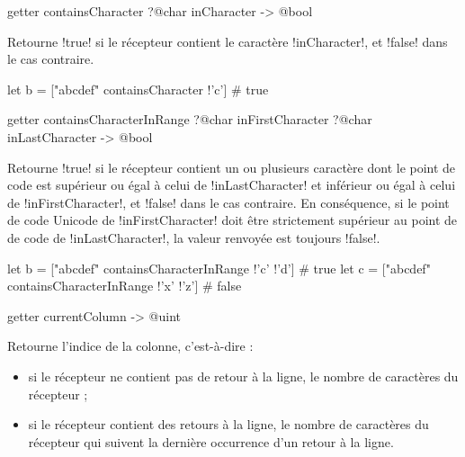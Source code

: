 
\begin{galgasbox}
getter containsCharacter ?@char inCharacter -> @bool
\end{galgasbox}
Retourne \ggs!true! si le récepteur contient le caractère \ggs!inCharacter!, et \ggs!false! dans le cas contraire.

\begin{galgas}
let b = ["abcdef" containsCharacter !'c'] # true
\end{galgas}






\begin{galgasbox}
getter containsCharacterInRange
  ?@char inFirstCharacter
  ?@char inLastCharacter
  -> @bool
\end{galgasbox}

Retourne \ggs!true! si le récepteur contient un ou plusieurs caractère dont le point de code est supérieur ou égal à celui de \ggs!inLastCharacter! et inférieur ou égal à celui de \ggs!inFirstCharacter!, et \ggs!false! dans le cas contraire. En conséquence, si le point de code Unicode de \ggs!inFirstCharacter! doit être strictement supérieur au point de de code de \ggs!inLastCharacter!, la valeur renvoyée est toujours \ggs!false!.

\begin{galgas}
let b = ["abcdef" containsCharacterInRange !'c' !'d'] # true
let c = ["abcdef" containsCharacterInRange !'x' !'z'] # false
\end{galgas}







\begin{galgasbox}
getter currentColumn -> @uint
\end{galgasbox}

Retourne l'indice de la colonne, c'est-à-dire :
\begin{itemize}
\item si le récepteur ne contient pas de retour à la ligne, le nombre de caractères du récepteur ;
\item si le récepteur contient des retours à la ligne, le nombre de caractères du récepteur qui suivent la dernière occurrence d'un retour à la ligne.
\end{itemize}







